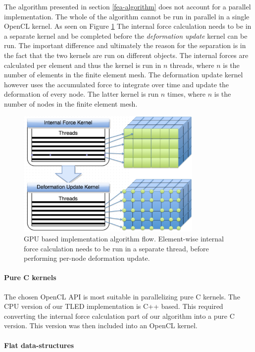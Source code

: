   The algorithm presented in section \ref{fea-algorithm} does not account for a parallel implementation. The whole of the algorithm cannot be run in parallel in a single OpenCL kernel. As seen on Figure \ref{gpu-kernels} The internal force calculation needs to be in a separate kernel and be completed before the \textit{deformation update} kernel can be run. The important difference and ultimately the reason for the separation is in the fact that the two kernels are run on different objects. The internal forces are calculated per element and thus the kernel is run in $n$ threads, where $n$ is the number of elements in the finite element mesh. The deformation update kernel however uses the accumulated force to integrate over time and update the deformation of every node. The latter kernel is run $n$ times, where $n$ is the number of nodes in the finite element mesh.

  \begin{figure}
    \centering
      \includegraphics[width=90mm]{sections/methodology/images/gpu/kernels.png}
    \caption{\label{gpu-kernels} GPU based implementation algorithm flow. Element-wise internal force calculation needs to be run in a separate thread, before performing per-node deformation update.}
  \end{figure}

  \paragraph{Pure C kernels}

  The chosen OpenCL API is most suitable in parallelizing pure C kernels. The CPU version of our TLED implementation is C++ based. This required converting the internal force calculation part of our algorithm into a pure C version. This version was then included into an OpenCL kernel.

  \paragraph{Flat data-structures}

